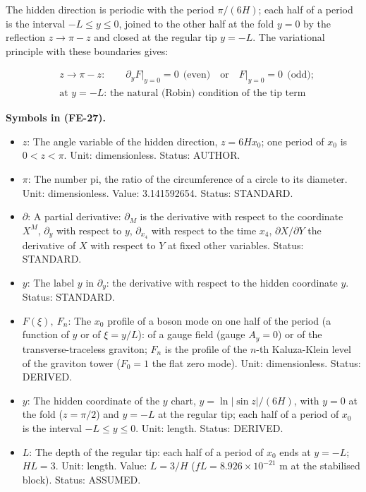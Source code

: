\documentclass[
  10pt,
]{article}
\providecommand{\tightlist}{%
  \setlength{\itemsep}{0pt}\setlength{\parskip}{0pt}}
\begin{document}
The hidden direction is periodic with the period \(\pi/(6H)\); each half
of a period is the interval \(-L \le y \le 0\), joined to the other half
at the fold \(y = 0\) by the reflection \(z \to \pi - z\) and closed at
the regular tip \(y = -L\). The variational principle with these
boundaries gives:

\[
\begin{aligned}
&z \to \pi - z:\qquad \partial_yF\big\vert_{y=0} = 0\ \ \text{(even)}\quad\text{or}\quad
 F\big\vert_{y=0} = 0\ \ \text{(odd)};\\
&\text{at } y = -L\text{: the natural (Robin) condition of the tip term}
\end{aligned} \tag{FE-27}
\]

\textbf{Symbols in (FE-27).}

\begin{itemize}
\tightlist
\item
  \(z\): The angle variable of the hidden direction, \(z = 6Hx_0\); one
  period of \(x_0\) is \(0 < z < \pi\). Unit: dimensionless. Status:
  AUTHOR.
\item
  \(\pi\): The number pi, the ratio of the circumference of a circle to
  its diameter. Unit: dimensionless. Value: 3.141592654. Status:
  STANDARD.
\item
  \(\partial\): A partial derivative: \(\partial_M\) is the derivative
  with respect to the coordinate \(X^M\), \(\partial_y\) with respect to
  \(y\), \(\partial_{x_4}\) with respect to the time \(x_4\),
  \(\partial X/\partial Y\) the derivative of \(X\) with respect to
  \(Y\) at fixed other variables. Status: STANDARD.
\item
  \(y\): The label \(y\) in \(\partial_y\): the derivative with respect
  to the hidden coordinate \(y\). Status: STANDARD.
\item
  \(F(\xi),\ F_n\): The \(x_0\) profile of a boson mode on one half of
  the period (a function of \(y\) or of \(\xi = y/L\)): of a gauge field
  (gauge \(A_y = 0\)) or of the transverse-traceless graviton; \(F_n\)
  is the profile of the \(n\)-th Kaluza-Klein level of the graviton
  tower (\(F_0 = 1\) the flat zero mode). Unit: dimensionless. Status:
  DERIVED.
\item
  \(y\): The hidden coordinate of the \(y\) chart,
  \(y = \ln\lvert\sin z\rvert/(6H)\), with \(y = 0\) at the fold
  (\(z = \pi/2\)) and \(y = -L\) at the regular tip; each half of a
  period of \(x_0\) is the interval \(-L \le y \le 0\). Unit: length.
  Status: DERIVED.
\item
  \(L\): The depth of the regular tip: each half of a period of \(x_0\)
  ends at \(y = -L\); \(HL = 3\). Unit: length. Value: \(L = 3/H\)
  (\(fL = 8.926\times10^{-21}\) m at the stabilised block). Status:
  ASSUMED.
\end{itemize}
\end{document}
